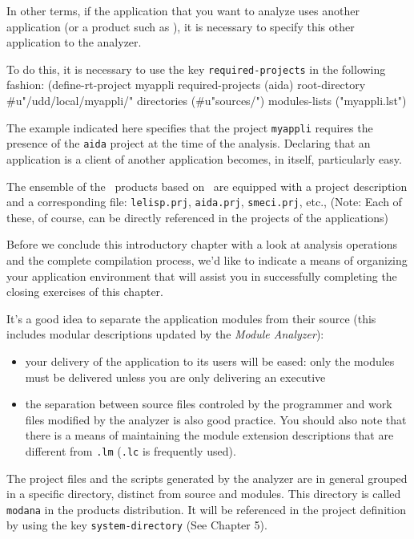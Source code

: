 In other terms, if the application that you want to analyze uses another application (or a product such as \Aida), it is necessary to specify this other application to the analyzer.

To do this, it is necessary to use the key {\tt required-projects} in the following fashion:
\BeginLL
(define-rt-project myappli
   required-projects (aida)
   root-directory #u"/udd/local/myappli/" 
   directories (#u"sources/")
   modules-lists ("myappli.lst") 
\EndLL

The example indicated here specifies that the project {\tt myappli} requires the presence of the {\tt aida} project at the time of the analysis.
Declaring that an application is a client of another application becomes, in itself, particularly easy.


The ensemble of the \Ilog\ products based on \LeLisp\ are equipped with
a project description and a corresponding file:
{\tt lelisp.prj},
{\tt aida.prj},
{\tt smeci.prj},
etc.,
(Note:  Each of these, of course, can be directly referenced in the projects of the applications)


Before we conclude this introductory chapter with a look at analysis operations and the complete compilation process, we'd like to indicate a means of organizing your application environment that will assist you in successfully completing the closing exercises of this chapter.


It's a good idea to separate the application modules from their source (this includes modular descriptions updated by the {\em Module Analyzer}):
\begin{itemize}
\item your delivery of the application to its users will be eased:  only the modules must be delivered unless you are only delivering an executive
\item the separation between source files controled by the programmer and work files modified by the analyzer is also good practice.  You should also note that there is a means of maintaining the module extension descriptions that are different from {\tt .lm} ({\tt .lc} is frequently used).
\end{itemize}


The project files and the scripts generated by the analyzer are in general grouped in a specific directory, distinct from source and modules. 
This directory is called
{\tt modana} in the \Ilog  products distribution.
It will be referenced in the project definition by using the key {\tt system-directory} (See Chapter 5).


